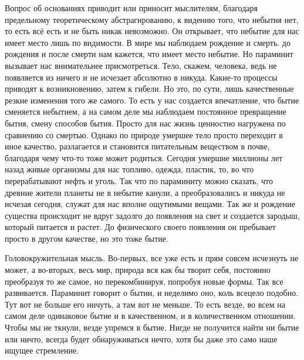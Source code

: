 Вопрос об основаниях приводит или
приносит мыслителям, благодаря предельному теоретическому абстрагированию, к
видению того, что небытия нет, то есть всё есть и не быть никак невозможно. Он
открывает, что небытие для нас имеет место лишь по видимости. В мире мы
наблюдаем рождение и смерть. до рождения и после смерти нам кажется, что имеет
место небытие. Но параминит вызывает нас внимательнее присмотреться. Тело,
скажем, человека, ведь не появляется из ничего и не исчезает абсолютно в никуда.
Какие-то процессы приводят к возникновению, затем к гибели. Но это, по сути,
лишь качественные резкие изменения того же самого. То есть у нас создается
впечатление, что бытие сменяется небытием, а на самом деле мы наблюдаем
постоянное превращение бытия, смену способов бытия. Просто для нас жизнь
ценностно нагружена по сравнению со смертью. Однако по природе умершее тело
просто переходит в иное качество, разлагается и становится питательным веществом
в почве, благодаря чему что-то тоже может родиться. Сегодня умершие миллионы лет
назад живые организмы для нас топливо, одежда, пластик, то, во что
перерабатывают нефть и уголь. Так что по параминиту можно сказать, что древние
жители планеты не в небытие канули, а преобразовались и никуда не исчезая
сегодня, служат для нас вполне ощутимыми вещами. Так же и рождение существа
происходит не вдруг задолго до появления на свет и создается зародыш, который
питается и растет. До физического своего появления он пребывает просто в другом
качестве, но это тоже бытие. 

Головокружительная мысль. Во-первых, все уже есть и
прям совсем исчезнуть не может, а во-вторых, весь мир, природа вся как бы творит
себя, постоянно преобразуя то же самое, но перекомбинируя, попробуя новые формы.
Так все развивается. Параминит говорит о бытии, и неделимо оно, коль всецело
подобно. Тут вот не больше его ничуть, а там вот не меньше. То есть везде, во
всем на самом деле одинаковое бытие и в качественном, и в количественном
отношении. Чтобы мы не ткнули, везде упремся в бытие. Нигде не получится найти
ни бытие или ничто, всегда будет обнаруживаться нечто, хотя бы даже это само
наше ищущее стремление. 

